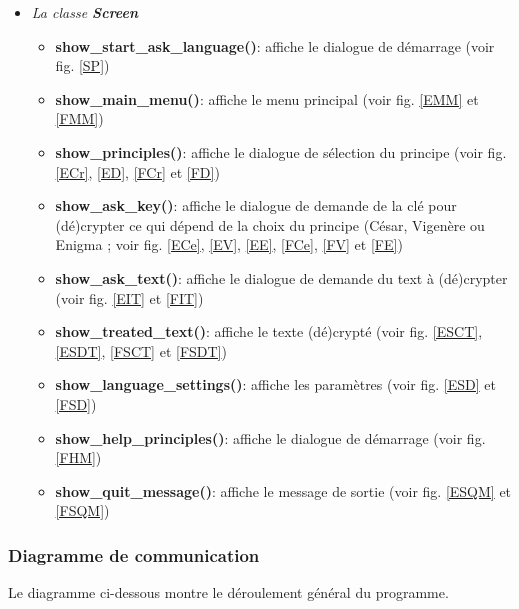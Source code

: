 \documentclass[a4paper,12pt,abstracton,titlepage]{scrartcl}
\begin{document}
\begin{itemize}
\item \textit{La classe \textbf{Screen}}\vspace{0.3cm}
\begin{itemize}
\item \textbf{show\_start\_ask\_language()}:
affiche le dialogue de démarrage (voir fig. \ref{SP})\\
\item \textbf{show\_main\_menu()}:
affiche le menu principal (voir fig. \ref{EMM} et \ref{FMM})\\
\item \textbf{show\_principles()}:
affiche le dialogue de sélection du principe (voir fig. \ref{ECr}, \ref{ED}, \ref{FCr} et \ref{FD})\\
\item \textbf{show\_ask\_key()}:
affiche le dialogue de demande de la clé pour (dé)crypter ce qui dépend de la choix du principe (César, Vigenère ou Enigma ; voir fig. \ref{ECe}, \ref{EV}, \ref{EE}, \ref{FCe}, \ref{FV} et \ref{FE})\\
\item \textbf{show\_ask\_text()}:
affiche le dialogue de demande du text à (dé)crypter\\(voir fig. \ref{EIT} et \ref{FIT})\\
\item \textbf{show\_treated\_text()}:
affiche le texte (dé)crypté (voir fig. \ref{ESCT}, \ref{ESDT}, \ref{FSCT} et \ref{FSDT})\\
\item \textbf{show\_language\_settings()}:
affiche les paramètres (voir fig. \ref{ESD} et \ref{FSD})\\
\item \textbf{show\_help\_principles()}:
affiche le dialogue de démarrage (voir fig. \ref{FHM})\\
\item \textbf{show\_quit\_message()}:
affiche le message de sortie (voir fig. \ref{ESQM} et \ref{FSQM})\\
\end{itemize}
\end{itemize}


\subsubsection{Diagramme de communication}
Le diagramme ci-dessous montre le déroulement général du programme.
\end{document}
